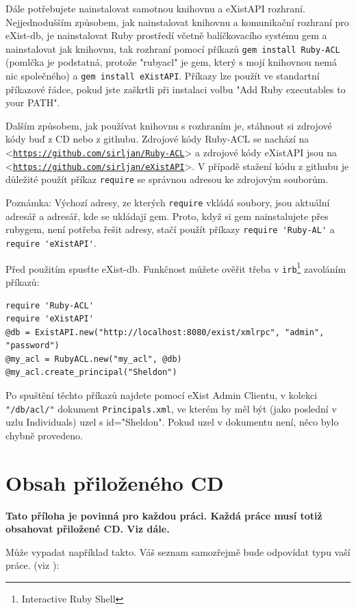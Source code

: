 \documentclass[11pt,twoside,a4paper]{book}
\let\oldUrl\url
\renewcommand\url[1]{<\texttt{\oldUrl{#1}}>}
\begin{document}
Dále potřebujete nainstalovat samotnou knihovnu a eXistAPI rozhraní.
Nejjednodušším způsobem, jak nainstalovat knihovnu a komunikační rozhraní pro eXist-db, je nainstalovat Ruby prostředí včetně balíčkovacího systému gem a nainstalovat jak knihovnu, tak rozhraní pomocí příkazů \verb|gem install Ruby-ACL| (pomlčka je podstatná, protože "rubyacl" je gem, který s mojí knihovnou nemá nic společného) a \verb|gem install eXistAPI|. Příkazy lze použít ve standartní příkazové řádce, pokud jste zaškrtli při instalaci volbu "Add Ruby executables to your PATH". 

Dalším způsobem, jak používat knihovnu s rozhraním je, stáhnout si zdrojové kódy buď z CD nebo z githubu. Zdrojové kódy Ruby-ACL se nachází na \url{https://github.com/sirljan/Ruby-ACL} a zdrojové kódy eXistAPI jsou na \url{https://github.com/sirljan/eXistAPI}. V případě stažení kódu z githubu je důležité použít příkaz \verb|require| se správnou adresou ke zdrojovým souborům. 

\noindent Poznámka: Výchozí adresy, ze kterých \verb|require| vkládá soubory, jsou aktuální adresář a adresář, kde se ukládají gem. Proto, když si gem nainstalujete přes rubygem, není potřeba řešit adresy, stačí použít příkazy \verb|require 'Ruby-AL'| a \verb|require 'eXistAPI'|.

\noindent Před použitím spusťte eXist-db. Funkčnost můžete ověřit třeba v \verb|irb|\footnote{Interactive Ruby Shell} zavoláním příkazů:

\begin{verbatim}
require 'Ruby-ACL'
require 'eXistAPI'
@db = ExistAPI.new("http://localhost:8080/exist/xmlrpc", "admin", "password")
@my_acl = RubyACL.new("my_acl", @db)
@my_acl.create_principal("Sheldon")
\end{verbatim}

Po spuštění těchto příkazů najdete pomocí eXist Admin Clientu, v kolekci \verb|"/db/acl/"| dokument  \verb|Principals.xml|, ve kterém by měl být (jako poslední v uzlu Individuals) uzel s id="Sheldon". Pokud uzel v dokumentu není, něco bylo chybně provedeno.

\chapter{Obsah přiloženého CD}
\textbf{\large Tato příloha je povinná pro každou práci. Každá práce musí totiž obsahovat přiložené CD. Viz dále.}

Může vypadat například takto. Váš seznam samozřejmě bude odpovídat typu vaší práce. (viz \cite{infodp}):
\end{document}
